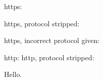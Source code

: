 \documentclass{ltugboat}
\begin{document}
https: 

https, protocol stripped: 

https, incorrect protocol given: 

http: 
http, protocol stripped: 

Hello.
\loggingall
\end{document}
